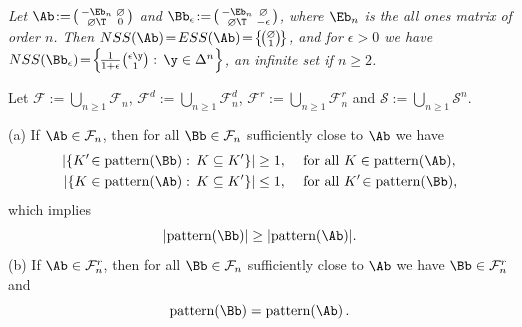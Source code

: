 \documentclass[moor]{informs3}              %
\begin{document}
\begin{exa}\label{ex1}
\emph{Let $\Ab\!:=\!\left(\begin{smallmatrix}-\Eb_n&\o\\ \o\T&0\end{smallmatrix}\right)$ and
$\Bb_\epsilon\!:=\!\left(\begin{smallmatrix}-\Eb_n&\o\\ \o\T&-\epsilon\end{smallmatrix}\right)$,
where $\Eb_n$ is the all ones matrix of order $n$.
Then $NSS(\Ab)\!=\!ESS(\Ab)\!=\!\left\{\!\left(\!\begin{smallmatrix}\o\\1\end{smallmatrix}\!\right)\!\right\}$, and for $\epsilon\!>\!0$ we have
$NSS(\Bb_\epsilon)\!=\!\left\{\!\frac1{1+\epsilon}\!
\left(\!\begin{smallmatrix}\epsilon\y\\ 1\end{smallmatrix}\!\right):\,\y\in\Delta^n \right\}$, an infinite set if $n\ge2$.}
\end{exa}

Let $\mathcal{F}:=\bigcup_{n\ge1}\mathcal{F}_n$, $\mathcal{F}^d:=\bigcup_{n\ge1}\mathcal{F}^d_{n}$, $\mathcal{F}^r:=\bigcup_{n\ge1}\mathcal{F}^r_{n}$ and $\mathcal{S}:=\bigcup_{n\ge1}\mathcal{S}^n$.

\begin{lem}\label{pattern}
(a) If $\Ab\in\mathcal{F}_n$, then
for all $\Bb\in\mathcal{F}_n$
sufficiently close to $\Ab$
we have
\begin{align}
|\{K'\!\in\textup{pattern}(\Bb):\,K\subseteq K'\}|\ge1,&\quad \textup{ for all }K\in\textup{pattern}(\Ab),\label{ge1}\\
|\{K\in\textup{pattern}(\Ab):\,K\subseteq K'\}|\le1,&\quad \textup{ for all }K'\!\in\textup{pattern}(\Bb),\label{le1}
\end{align}
which implies
$$|\textup{pattern}(\Bb)|\ge |\textup{pattern}(\Ab)|.$$
(b) If $\Ab\in\mathcal{F}^r_n$, then
for all $\Bb\in\mathcal{F}_n$ sufficiently close to $\Ab$ we have $\Bb\in\mathcal{F}^r_n$ and
$$\textup{pattern}(\Bb)=\textup{pattern}(\Ab)\, .$$
\end{lem}
\end{document}

